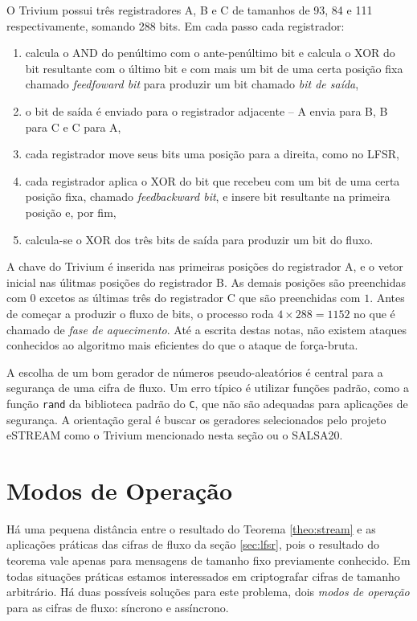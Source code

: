 O Trivium possui três registradores A, B e C de tamanhos de 93, 84 e 111 respectivamente, somando 288 bits.
Em cada passo cada registrador:
\begin{enumerate}
\item calcula o AND do penúltimo com o ante-penúltimo bit e calcula o XOR do bit resultante com o último bit e com mais um bit de uma certa posição fixa chamado {\em feedfoward bit} para produzir um bit chamado {\em bit de saída},
\item o bit de saída é enviado para o registrador adjacente -- A envia para B, B para C e C para A,
\item cada registrador move seus bits uma posição para a direita, como no LFSR,
\item cada registrador aplica o XOR do bit que recebeu com um bit de uma certa posição fixa, chamado {\em feedbackward bit}, e insere bit resultante na primeira posição e, por fim,
\item calcula-se o XOR dos três bits de saída para produzir um bit do fluxo.
\end{enumerate}

A chave do Trivium é inserida nas primeiras posições do registrador A, e o vetor inicial nas úlitmas posições do registrador B.
As demais posições são preenchidas com $0$ excetos as últimas três do registrador C que são preenchidas com $1$.
Antes de começar a produzir o fluxo de bits, o processo roda $4 \times 288 = 1152$ no que é chamado de {\em fase de aquecimento}. 
Até a escrita destas notas, não existem ataques conhecidos ao algoritmo mais eficientes do que o ataque de força-bruta.


A escolha de um bom gerador de números pseudo-aleatórios é central para a segurança de uma cifra de fluxo.
Um erro típico é utilizar funções padrão, como a função {\tt rand} da biblioteca padrão do {\tt C}, que não são adequadas para aplicações de segurança.
A orientação geral é buscar os geradores selecionados pelo projeto eSTREAM como o Trivium mencionado nesta seção ou o SALSA20.

\section{Modos de Operação}
\label{sec:modos-de-operacao}

Há uma pequena distância entre o resultado do Teorema \ref{theo:stream} e as aplicações práticas das cifras de fluxo da seção \ref{sec:lfsr}, pois o resultado do teorema vale apenas para mensagens de tamanho fixo previamente conhecido.
Em todas situações práticas estamos interessados em criptografar cifras de tamanho arbitrário.
Há duas possíveis soluções para este problema, dois {\em modos de operação} para as cifras de fluxo: síncrono e assíncrono.

